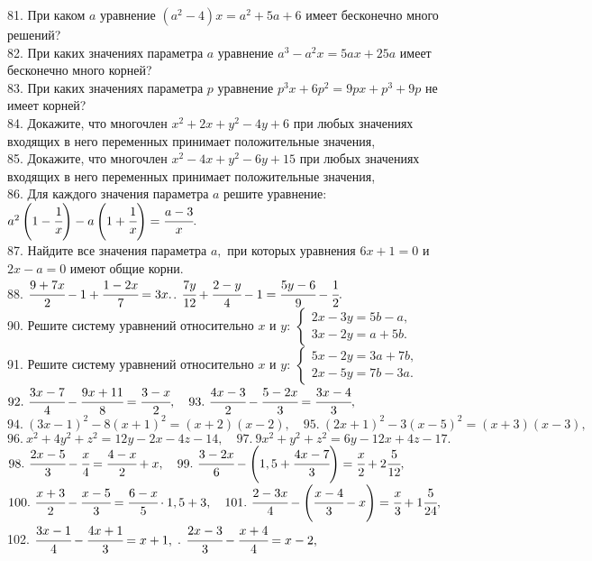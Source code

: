 81. При каком $a$ уравнение $(a^2-4)x=a^2+5a+6$ имеет бесконечно много решений?\\
82. При каких значениях параметра $a$ уравнение $a^3-a^2x=5ax+25a$ имеет бесконечно много корней?\\
83. При каких значениях параметра $p$ уравнение $p^3x+6p^2=9px+p^3+9p$ не имеет корней?\\
84. Докажите, что многочлен $x^2+2x+y^2-4y+6$ при любых значениях входящих в него переменных принимает положительные значения,\\
85. Докажите, что многочлен $x^2-4x+y^2-6y+15$ при любых значениях входящих в него переменных принимает положительные значения,\\
86. Для каждого значения параметра $a$ решите уравнение: $a^2\left(1-\cfrac{1}{x}\right)-a\left(1+\cfrac{1}{x}\right)=\cfrac{a-3}{x}.$\\
87. Найдите все значения параметра $a,$ при которых уравнения $6x+1=0$ и $2x-a=0$ имеют общие корни.\\
88. $\cfrac{9+7x}{2}-1+\cfrac{1-2x}{7}=3x.$\qquad{}. $\cfrac{7y}{12}+\cfrac{2-y}{4}-1=\cfrac{5y-6}{9}-\cfrac{1}{2}.$\\
90. Решите систему уравнений относительно $x$ и $y:\ \begin{cases}2x-3y=5b-a,\\ 3x-2y=a+5b. \end{cases}$\\
91. Решите систему уравнений относительно $x$ и $y:\ \begin{cases}5x-2y=3a+7b,\\ 2x-5y=7b-3a. \end{cases}$\\
$92.\ \cfrac{3x-7}{4}-\cfrac{9x+11}{8}=\cfrac{3-x}{2}, \quad 93.\ \cfrac{4x-3}{2}-\cfrac{5-2x}{3}=\cfrac{3x-4}{3},$\\
$94.\ (3x-1)^2-8(x+1)^2=(x+2)(x-2), \quad 95.\ (2x+1)^2-3(x-5)^2=(x+3)(x-3),$\\
$96.\ x^2+4y^2+z^2=12y-2x-4z-14, \quad 97.\ 9x^2+y^2+z^2=6y-12x+4z-17.$\\
$98.\ \cfrac{2x-5}{3}-\cfrac{x}{4}=\cfrac{4-x}{2}+x, \quad 99.\ \cfrac{3-2x}{6}-\left(1,5+\cfrac{4x-7}{3}\right)=\cfrac{x}{2}+2\cfrac{5}{12},$\\
$100.\ \cfrac{x+3}{2}-\cfrac{x-5}{3}=\cfrac{6-x}{5}\cdot1,5+3, \quad 101.\ \cfrac{2-3x}{4}-\left(\cfrac{x-4}{3}-x\right)=\cfrac{x}{3}+1\cfrac{5}{24},$\\
102. $\cfrac{3x-1}{4}-\cfrac{4x+1}{3}=x+1,$ . $\cfrac{2x-3}{3}-\cfrac{x+4}{4}=x-2,$\\
